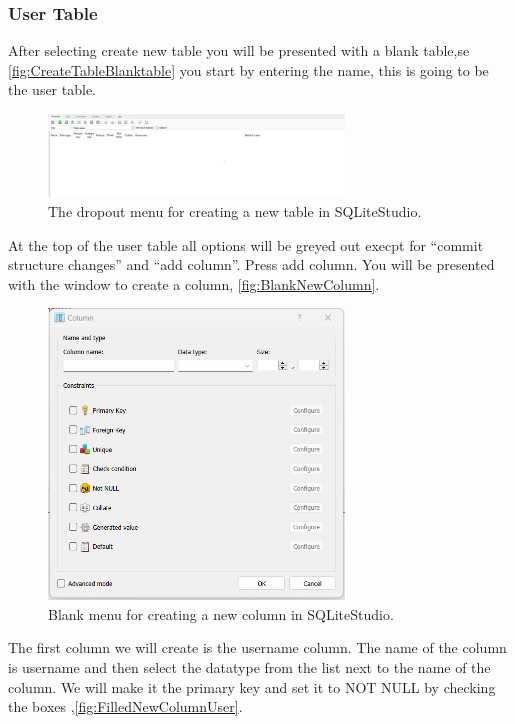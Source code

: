 \documentclass[a4paper,11pt,oneside]{article}
\begin{document}
\begin{sloppypar}
\subsubsection{User Table}
\label{sqliteStudioUserTable}
After selecting create new table you will be presented with a blank table,se \autoref{fig:CreateTableBlanktable} you start by entering the name, this is going to be the user table.
\begin{figure}[!htb]
  \centering
  \includegraphics[width=0.7\textwidth]{sqlitestudio/create_table/create_table_blank.png}
  \caption{The dropout menu for creating a new table in SQLiteStudio.}
  \label{fig:CreateTableBlanktable}
\end{figure}
At the top of the user table all options will be greyed out execpt for ``commit structure changes'' and ``add column''. Press add column. You will be presented with the window to create a column, \autoref{fig:BlankNewColumn}. 
\begin{figure}[!htb]
  \centering
  \includegraphics[width=0.7\textwidth]{sqlitestudio/create_table/create_table_column_blank.png}
  \caption{Blank menu for creating a new column in SQLiteStudio.}
  \label{fig:BlankNewColumn}
\end{figure}
The first column we will create is the username column. The name of the column is username and then select the datatype from the list next to the name of the column. We will make it the primary key and set it to NOT NULL by checking the boxes ,\autoref{fig:FilledNewColumnUser}. 

\end{sloppypar}
\end{document}
